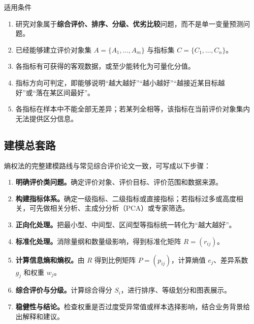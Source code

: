 \documentclass[UTF8,a4paper,12pt]{ctexart}
\begin{document}
\begin{methodbox}{适用条件}
\begin{enumerate}
  \item 研究对象属于\textbf{综合评价、排序、分级、优劣比较}问题，而不是单一变量预测问题。
  \item 已经能够建立评价对象集 $A=\{A_1,\ldots,A_m\}$ 与指标集 $C=\{C_1,\ldots,C_n\}$。
  \item 各指标有可获得的客观数据，或至少能转化为可量化分值。
  \item 指标方向可判定，即能够说明“越大越好”“越小越好”“越接近某目标越好”或“落在某区间最好”。
  \item 各指标在样本中不能全部无差异；若某列全相等，该指标在当前评价对象集内无法提供区分信息。
\end{enumerate}
\end{methodbox}

\subsection{建模总套路}

熵权法的完整建模路线与常见综合评价论文一致，可写成以下步骤：

\begin{enumerate}
  \item \textbf{明确评价类问题。}确定评价对象、评价目标、评价范围和数据来源。
  \item \textbf{构建指标体系。}确定一级指标、二级指标或直接指标；若指标过多或高度相关，可先做相关分析、主成分分析（PCA）或专家筛选。
  \item \textbf{正向化处理。}把最小型、中间型、区间型等指标统一转化为“越大越好”。
  \item \textbf{标准化处理。}消除量纲和数量级影响，得到标准化矩阵 $R=(r_{ij})$。
  \item \textbf{计算信息熵和熵权。}由 $R$ 得到比例矩阵 $P=(p_{ij})$，计算熵值 $e_j$、差异系数 $g_j$ 和权重 $w_j$。
  \item \textbf{综合评价与分级。}计算综合得分 $S_i$，进行排序、等级划分和图表展示。
  \item \textbf{稳健性与结论。}检查权重是否过度受异常值或样本选择影响，结合业务背景给出解释和建议。
\end{enumerate}
\end{document}

